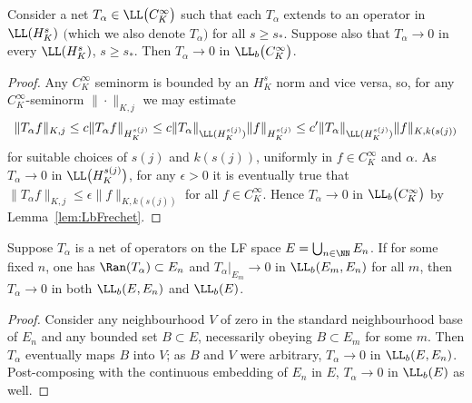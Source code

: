  \begin{Corollary} \label{cor:HstoCinfty}
 	Consider a net $T_\alpha\in \LL\big(C^\infty_K\big)$
 	such that each $T_\alpha$ extends to an operator in~$\LL(H^s_K)$ $($which we also denote $T_\alpha$$)$ for all $s\ge s_*$. Suppose also that $T_\alpha\to 0$ in every $\LL(H^s_K)$, $s\ge s_*$. Then $T_\alpha\to 0$ in $\LL_b\big(C^\infty_K\big)$.
 \end{Corollary}
 \begin{proof}
Any $C^\infty_K$ seminorm is bounded by an $H^s_K$ norm and vice versa, so, for any
 	$C^\infty_K$-seminorm $\|\cdot\|_{K,j}$ we may estimate
 	\begin{equation*}
 		\|T_\alpha f\|_{K,j} \le c \| T_\alpha f\|_{H^{s(j)}_K} \le c\|T_\alpha\|_{\LL(H^{s(j)}_K)} \|f\|_{H^{s(j)}_K}
 		\le c' \|T_\alpha\|_{\LL(H^{s(j)}_K)} \|f\|_{K,k(s(j))}
 	\end{equation*}
 	for suitable choices of $s(j)$ and $k(s(j))$, uniformly in $f\in C^\infty_K$ and $\alpha$.
 	As $T_\alpha\to 0$ in $\LL\big(H^{s(j)}_K\big)$, for any $\epsilon>0$ it is eventually true that
 	$\|T_\alpha f\|_{K,j} \le \epsilon \|f\|_{K,k(s(j))}$ for all $f\in C^\infty_K$. Hence $T_\alpha\to 0$ in $\LL_b\big(C^\infty_K\big)$ by Lemma~\ref{lem:LbFrechet}.
 \end{proof}

 \begin{Lemma}\label{lem:LbLF}
 	Suppose $T_\alpha$ is a net of operators on the LF space $E=\bigcup_{n\in\NN} E_n$. If for some fixed $n$, one has $\Ran(T_\alpha)\subset E_n$ and $T_\alpha|_{E_m}\to 0$ in $\LL_b(E_m,E_n)$ for all $m$, then $T_\alpha\to 0$ in both $\LL_b(E,E_n)$ and $\LL_b(E)$.
 \end{Lemma}
 \begin{proof}
 	Consider any neighbourhood $V$ of zero in the standard neighbourhood base of $E_n$ and any bounded set $B\subset E$, necessarily obeying $B\subset E_m$ for some $m$. Then $T_\alpha$ eventually maps $B$ into $V$; as $B$ and $V$ were arbitrary, $T_\alpha\to 0$ in $\LL_b(E,E_n)$. Post-composing with the continuous embedding of $E_n$ in $E$, $T_\alpha\to 0$ in $\LL_b(E)$ as well.
 \end{proof}

